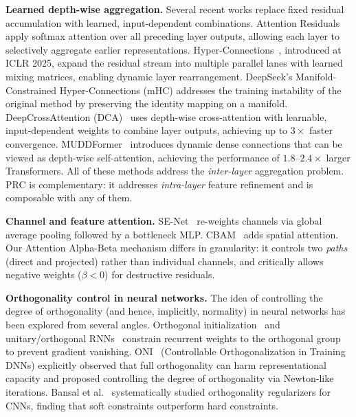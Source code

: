\documentclass[11pt,a4paper]{article}
\theoremstyle{definition}
\begin{document}
\textbf{Learned depth-wise aggregation.}
Several recent works replace fixed residual accumulation with
learned, input-dependent combinations.
Attention Residuals~\cite{chen2026attnres} apply softmax attention
over all preceding layer outputs, allowing each layer to selectively
aggregate earlier representations.
Hyper-Connections~\cite{zhu2025hyperconnections}, introduced at
ICLR 2025, expand the residual stream into multiple parallel lanes
with learned mixing matrices, enabling dynamic layer rearrangement.
DeepSeek's Manifold-Constrained Hyper-Connections (mHC) addresses
the training instability of the original method by preserving the
identity mapping on a manifold.
DeepCrossAttention (DCA)~\cite{axiotis2025dca} uses depth-wise
cross-attention with learnable, input-dependent weights to combine
layer outputs, achieving up to $3\times$ faster convergence.
MUDDFormer~\cite{he2025muddformer} introduces dynamic dense
connections that can be viewed as depth-wise self-attention,
achieving the performance of $1.8$--$2.4\times$ larger Transformers.
All of these methods address the \emph{inter-layer} aggregation
problem. PRC is complementary: it addresses \emph{intra-layer}
feature refinement and is composable with any of them.

\textbf{Channel and feature attention.}
SE-Net~\cite{hu2018senet} re-weights channels via global average
pooling followed by a bottleneck MLP. CBAM~\cite{woo2018cbam}
adds spatial attention.  Our Attention Alpha-Beta mechanism differs
in granularity: it controls two \emph{paths} (direct and projected)
rather than individual channels, and critically allows negative
weights ($\beta < 0$) for destructive residuals.

\textbf{Orthogonality control in neural networks.}
The idea of controlling the degree of orthogonality (and hence,
implicitly, normality) in neural networks has been explored from
several angles. Orthogonal initialization~\cite{saxe2014exact}
and unitary/orthogonal RNNs~\cite{arjovsky2016unitary,helfrich2018cayley}
constrain recurrent weights to the orthogonal group to prevent
gradient vanishing. ONI~\cite{huang2020oni} (Controllable
Orthogonalization in Training DNNs) explicitly observed that
full orthogonality can harm representational capacity and proposed
controlling the degree of orthogonality via Newton-like iterations.
Bansal et al.~\cite{bansal2018orthogonality} systematically
studied orthogonality regularizers for CNNs, finding that soft
constraints outperform hard constraints.
\end{document}
